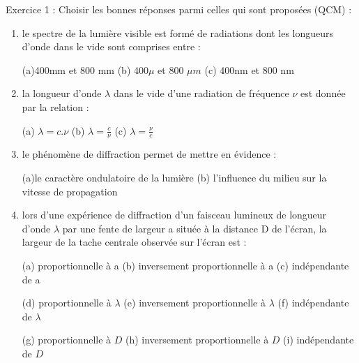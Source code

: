 \documentclass[12pt, french]{article}
\begin{document}
\begin{center}

\end{center}

\vspace{-0.4cm}
   \begin{Box2}{Exercice 1 :  Choisir les bonnes réponses parmi celles qui sont proposées (QCM) : }
	   \begin{enumerate}
		   \item  le spectre de la lumière visible est formé de radiations dont les longueurs d’onde dans le vide sont
comprises entre :

(a)400mm et 800 mm \hspace{1cm}(b) 400$\mu$ et 800 $\mu m$ \hspace{1cm}(c) 400nm et 800 nm

\item la longueur d’onde $\lambda$ dans le vide d’une radiation de fréquence $\nu$ est donnée par la relation : 

	(a) $\lambda=c.\nu$ \hspace{3cm}(b) $\lambda=\frac{c}{\nu}$ \hspace{2.6cm}  (c) $\lambda=\frac{\nu}{c}$

\item le phénomène de diffraction permet de mettre en évidence :

	(a)le caractère ondulatoire de la lumière \hspace{0.5cm} (b) l’influence du milieu sur la vitesse de propagation

\item lors d’une expérience de diffraction d’un faisceau lumineux de longueur d’onde $\lambda$ par une fente de largeur a située à la distance D de l’écran, la largeur de la tache centrale observée sur l’écran est :

	(a) proportionnelle à a \hspace{0.6cm} (b) inversement proportionnelle à a \hspace{0.6cm} (c) indépendante de a

	(d) proportionnelle à $\lambda$ \hspace{0.6cm} (e) inversement proportionnelle à $\lambda$ \hspace{0.6cm} (f) indépendante de $\lambda$
	
	(g) proportionnelle à $D$ \hspace{0.6cm} (h) inversement proportionnelle à $D$ \hspace{0.6cm} (i) indépendante de $D$

\end{enumerate}
   \end{Box2}
   
\end{document}
